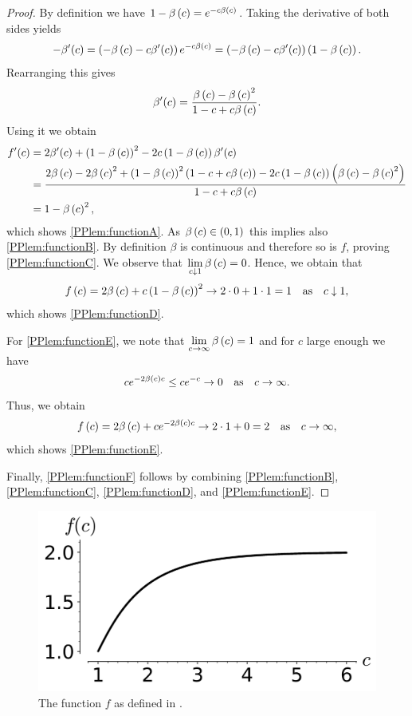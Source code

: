 \begin{proof}
By definition we have $1-\beta\left(c\right)=e^{-c\beta\left(c\right)}$. Taking the derivative of both sides yields
\begin{align*}
-\beta'(c)=\left(-\beta\left(c\right)-c\beta'(c)\right)e^{-c\beta\left(c\right)}=\left(-\beta\left(c\right)-c\beta'(c)\right)\left(1-\beta\left(c\right)\right).
\end{align*}
Rearranging this gives 
\begin{align*}
\beta'(c)=\frac{\beta\left(c\right)-\beta\left(c\right)^2}{1-c+c\beta\left(c\right)}.
\end{align*}
Using it we obtain
\begin{align*}
f'(c)&=2\beta'(c)+\left(1-\beta\left(c\right)\right)^2-2c\left(1-\beta\left(c\right)\right)\beta'(c)\\
&=
\frac{2\beta\left(c\right)-2\beta\left(c\right)^2+\left(1-\beta\left(c\right)\right)^2\left(1-c+c\beta\left(c\right)\right)-2c\left(1-\beta\left(c\right)\right)\left(\beta\left(c\right)-\beta\left(c\right)^2\right)}{1-c+c\beta\left(c\right)}
\\
&=1-\beta\left(c\right)^2,
\end{align*}
which shows \ref{PPlem:functionA}. As $\beta\left(c\right)\in \left(0,1\right)$ this implies also \ref{PPlem:functionB}. By definition $\beta$ is continuous and therefore so is $f$, proving \ref{PPlem:functionC}. We observe that $\lim\limits_{c\downarrow 1}\beta\left(c\right)=0$. Hence, we obtain that
\begin{align*}
f\left(c\right)=2\beta\left(c\right)+c\left(1-\beta\left(c\right)\right)^2\to 2\cdot 0+1\cdot 1=1\quad \text{as} \quad c\downarrow 1,
\end{align*}
which shows \ref{PPlem:functionD}. 

For \ref{PPlem:functionE}, we note that $\lim\limits_{c\to \infty}\beta\left(c\right)=1$ and for $c$ large enough we have
\begin{align*}
ce^{-2\beta\left(c\right)c}\leq ce^{-c} \to 0 \quad \text{as} \quad c\to \infty.
\end{align*}
Thus, we obtain
\begin{align*}
f\left(c\right)=2\beta\left(c\right)+ce^{-2\beta\left(c\right)c}\to 2\cdot 1+0=2 \quad \text{as}\quad c\to\infty,
\end{align*}
which shows \ref{PPlem:functionE}. 

Finally, \ref{PPlem:functionF} follows by combining \ref{PPlem:functionB}, \ref{PPlem:functionC}, \ref{PPlem:functionD}, and \ref{PPlem:functionE}.
\end{proof}
\begin{figure}[t]
\centering
	\includegraphics[scale=0.33]{process-function.png}
	\caption{The function $f$ as defined in .}
	\label{PPfig:function}
\end{figure}